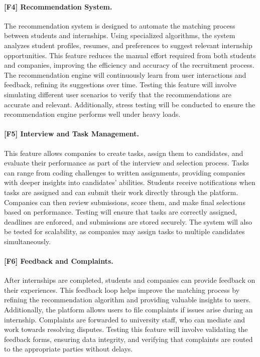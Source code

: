 \paragraph{[F4] Recommendation System.} The recommendation system is designed to automate the matching process between students and internships. Using specialized algorithms, the system analyzes student profiles, resumes, and preferences to suggest relevant internship opportunities. This feature reduces the manual effort required from both students and companies, improving the efficiency and accuracy of the recruitment process. The recommendation engine will continuously learn from user interactions and feedback, refining its suggestions over time. Testing this feature will involve simulating different user scenarios to verify that the recommendations are accurate and relevant. Additionally, stress testing will be conducted to ensure the recommendation engine performs well under heavy loads.

\paragraph{[F5] Interview and Task Management.} This feature allows companies to create tasks, assign them to candidates, and evaluate their performance as part of the interview and selection process. Tasks can range from coding challenges to written assignments, providing companies with deeper insights into candidates' abilities. Students receive notifications when tasks are assigned and can submit their work directly through the platform. Companies can then review submissions, score them, and make final selections based on performance. Testing will ensure that tasks are correctly assigned, deadlines are enforced, and submissions are stored securely. The system will also be tested for scalability, as companies may assign tasks to multiple candidates simultaneously.

\paragraph{[F6] Feedback and Complaints.} After internships are completed, students and companies can provide feedback on their experiences. This feedback loop helps improve the matching process by refining the recommendation algorithm and providing valuable insights to users. Additionally, the platform allows users to file complaints if issues arise during an internship. Complaints are forwarded to university staff, who can mediate and work towards resolving disputes. Testing this feature will involve validating the feedback forms, ensuring data integrity, and verifying that complaints are routed to the appropriate parties without delays.

